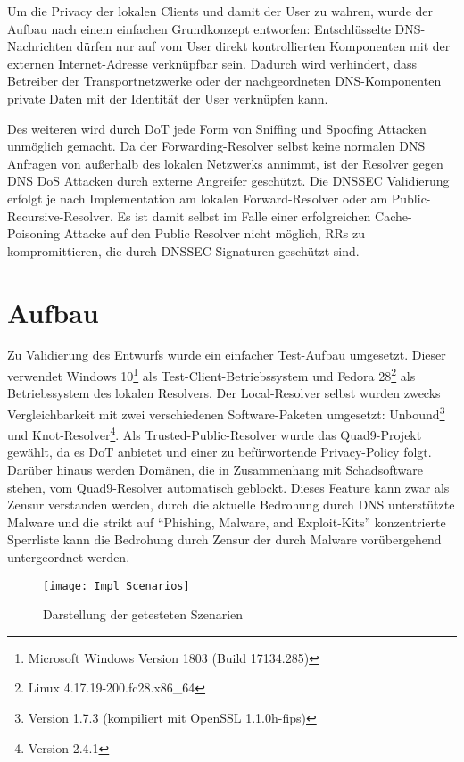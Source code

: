 Um die Privacy der lokalen Clients und damit der User zu wahren, wurde der Aufbau nach einem einfachen Grundkonzept entworfen: Entschlüsselte DNS-Nachrichten dürfen nur auf vom User direkt kontrollierten Komponenten mit der externen Internet-Adresse verknüpfbar sein. Dadurch wird verhindert, dass Betreiber der Transportnetzwerke oder der nachgeordneten DNS-Komponenten private Daten mit der Identität der User verknüpfen kann.

Des weiteren wird durch DoT jede Form von Sniffing und Spoofing Attacken unmöglich gemacht. Da der Forwarding-Resolver selbst keine normalen DNS Anfragen von außerhalb des lokalen Netzwerks annimmt, ist der Resolver gegen DNS DoS Attacken durch externe Angreifer geschützt. Die \ac{DNSSEC} Validierung erfolgt je nach Implementation am lokalen Forward-Resolver oder am Public-Recursive-Resolver. Es ist damit selbst im Falle einer erfolgreichen Cache-Poisoning Attacke auf den Public Resolver nicht möglich, RRs zu kompromittieren, die durch \ac{DNSSEC} Signaturen geschützt sind.

\section{Aufbau}
\label{sec:architecture}
Zu Validierung des Entwurfs wurde ein einfacher Test-Aufbau umgesetzt. Dieser verwendet Windows 10\footnote{Microsoft Windows Version 1803 (Build 17134.285)} als Test-Client-Betriebssystem und Fedora 28\footnote{Linux 4.17.19-200.fc28.x86\_64} als Betriebssystem des lokalen Resolvers. Der Local-Resolver selbst wurden zwecks Vergleichbarkeit mit zwei verschiedenen Software-Paketen umgesetzt: Unbound\footnote{Version 1.7.3 (kompiliert mit OpenSSL 1.1.0h-fips)} und Knot-Resolver\footnote{Version 2.4.1}. Als Trusted-Public-Resolver wurde das Quad9-Projekt gewählt, da es DoT anbietet und einer zu befürwortende Privacy-Policy\cite{Quad9Privacy} folgt. Darüber hinaus werden Domänen, die in Zusammenhang mit Schadsoftware stehen, vom Quad9-Resolver automatisch geblockt. Dieses Feature kann zwar als Zensur verstanden werden, durch die aktuelle Bedrohung durch DNS unterstützte Malware \cite{Alcoy2017} und die strikt auf ``Phishing, Malware, and Exploit-Kits'' konzentrierte Sperrliste\cite{Quad9FAQ} kann die Bedrohung durch Zensur der durch Malware vorübergehend untergeordnet werden.   
\begin{wrapfigure}{r}{0.5\textwidth}
    \begin{center}
    \texttt{[image: Impl\_Scenarios]}
    \end{center}
    \caption{Darstellung der getesteten Szenarien}
    \label{img:impl-scenarios}
\end{wrapfigure}

